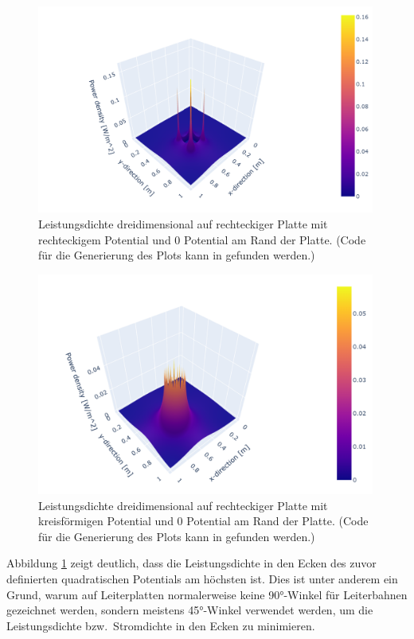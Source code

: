 \begin{figure}[h]
	\centering
	\includegraphics[width=0.99\textwidth]{papers/circuit/3d.png}
	\caption{Leistungsdichte dreidimensional auf rechteckiger Platte mit rechteckigem Potential und 0 Potential am Rand der Platte. (Code für die Generierung des Plots kann in \cite{github:AndreasFMueller} gefunden werden.)}
	\label{fig:power_3d_rectangle}
\end{figure}%
\begin{figure}[h]
	\centering
	\includegraphics[width=0.99\textwidth]{papers/circuit/3d_circle.png}
	\caption{Leistungsdichte dreidimensional auf rechteckiger Platte mit kreisförmigen Potential und 0 Potential am Rand der Platte. (Code für die Generierung des Plots kann in \cite{github:AndreasFMueller} gefunden werden.)}
	\label{fig:power_3d_circle}
\end{figure}%
Abbildung \ref{fig:power_3d_rectangle} zeigt deutlich, dass die
Leistungsdichte in den Ecken des zuvor definierten quadratischen
Potentials am höchsten ist. Dies ist unter anderem ein Grund, warum
auf Leiterplatten normalerweise keine 90°-Winkel für Leiterbahnen
gezeichnet werden, sondern meistens 45°-Winkel verwendet werden,
um die Leistungsdichte bzw.~Stromdichte in den Ecken zu minimieren.
%

